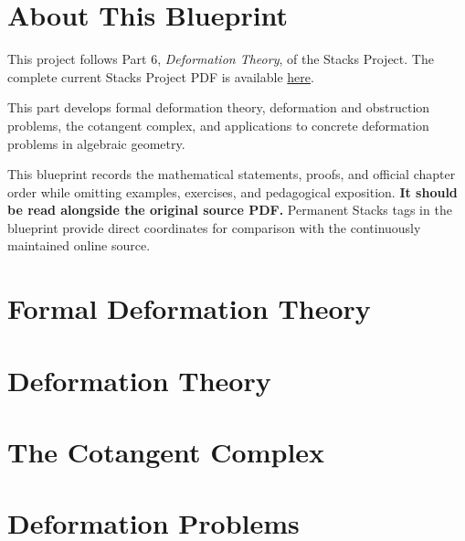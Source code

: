 

\chapter*{About This Blueprint}

This project follows Part 6, \emph{Deformation Theory}, of the Stacks Project.
The complete current Stacks Project PDF is available
\href{https://stacks.math.columbia.edu/download/book.pdf}{here}.

This part develops formal deformation theory, deformation and obstruction
problems, the cotangent complex, and applications to concrete deformation
problems in algebraic geometry.

This blueprint records the mathematical statements, proofs, and official
chapter order while omitting examples, exercises, and pedagogical exposition.
\textbf{It should be read alongside the original source PDF.} Permanent Stacks
tags in the blueprint provide direct coordinates for comparison with the
continuously maintained online source.

\chapter{Formal Deformation Theory}
\label{chap:formal-defos}


\chapter{Deformation Theory}
\label{chap:defos}


\chapter{The Cotangent Complex}
\label{chap:cotangent}


\chapter{Deformation Problems}
\label{chap:examples-defos}

